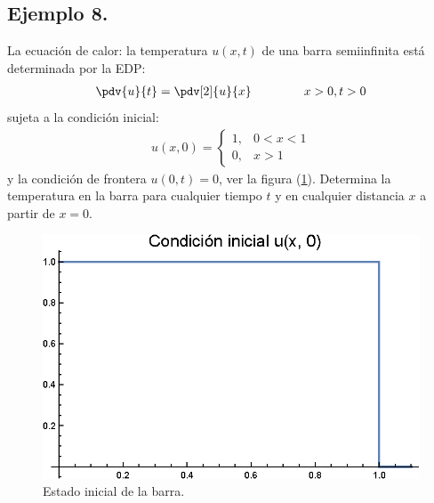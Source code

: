 \subsection*{Ejemplo 8.}

La ecuación de calor: la temperatura $u (x, t)$ de una barra semiinfinita está determinada por la EDP:
\begin{align*}
\pdv{u}{t} = \pdv[2]{u}{x} \hspace{1.5cm} x > 0, t > 0
\end{align*}
sujeta a la condición inicial:
\begin{align*}
u (x, 0) = \begin{cases}
1, & 0 < x < 1  \\
0, & x > 1
\end{cases}
\end{align*}
y la condición de frontera $u (0, t) = 0$, ver la figura (\ref{fig:figura_plot_Ejemplo_06_01}). Determina la temperatura en la barra para cualquier tiempo $t$ y en cualquier distancia $x$ a partir de $x = 0$.
\begin{figure}[H]
    \centering
    \includegraphics[scale=1]{Imagenes/Plot_Ejemplo_06_01.eps}
    \caption{Estado inicial de la barra.}
    \label{fig:figura_plot_Ejemplo_06_01}
\end{figure}

